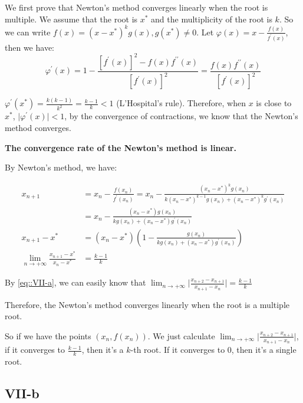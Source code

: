 \documentclass[a4paper]{article}
\begin{document}
We first prove that Newton's method converges linearly when the root is multiple. We assume that the root is $x^*$ and the multiplicity of the root is $k$. So we can write $f(x) = (x-x^*)^k g(x), g(x^*) \ne 0$. Let $\varphi(x) = x - \frac{f(x)}{f^\prime(x)}$, then we have:
\begin{equation}
  \varphi^\prime (x) = 1 - \frac{[f^\prime (x)]^2 - f(x)f^{\prime \prime}(x)}{[f^\prime (x)]^2} = \frac{f(x)f^{\prime \prime}(x)}{[f^\prime (x)]^2}
\end{equation}

$\varphi^\prime (x^*) = \frac{k(k-1)}{k^2} = \frac{k-1}{k} < 1$ (L'Hospital's rule). Therefore, when $x$ is close to $x^*$, $\vert \varphi^\prime (x) \vert < 1$, by the convergence of contractions, we know that the Newton's method converges. 

\textbf{The convergence rate of the Newton's method is linear.}

By Newton's method, we have:

\begin{equation}
  \begin{aligned}
    x_{n+1} &= x_n - \frac{f(x_n)}{f^\prime(x_n)} = x_n - \frac{(x_n-x^*)^k g(x_n)}{k(x_n-x^*)^{k-1}g(x_n) + (x_n-x^*)^k g^\prime(x_n)}\\
    &= x_n - \frac{(x_n-x^*) g(x_n)}{k g(x_n) + (x_n-x^*) g^\prime(x_n)} \\ 
    x_{n+1} - x^* &= (x_n - x^*) (1 - \frac{g(x_n)}{k g(x_n) + (x_n-x^*) g^\prime(x_n)}) \\ 
    \lim_{n \rightarrow +\infty}\frac{x_{n+1} - x^*}{x_n - x^*} &= \frac{k-1}{k}
  \end{aligned}
  \label{eq::VII-a}
\end{equation}

By \ref{eq::VII-a}, we can easily know that $\lim_{n \rightarrow +\infty}\vert \frac{x_{n+2} - x_{n+1}}{x_{n+1} - x_{n}} \vert = \frac{k-1}{k}$

Therefore, the Newton's method converges linearly when the root is a multiple root. 

So if we have the points $(x_n, f(x_n))$. We just calculate $\lim_{n \rightarrow +\infty}\vert \frac{x_{n+2} - x_{n+1}}{x_{n+1} - x_{n}} \vert$, if it converges to $\frac{k-1}{k}$, then it's a $k$-th root. If it converges to 0, then it's a single root. 

\subsection*{VII-b}
\end{document}
